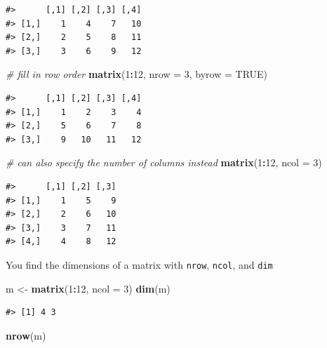 \documentclass[]{book}
\newenvironment{Shaded}{\begin{snugshade}}{\end{snugshade}}
\newcommand{\KeywordTok}[1]{\textcolor[rgb]{0.13,0.29,0.53}{\textbf{#1}}}
\newcommand{\DataTypeTok}[1]{\textcolor[rgb]{0.13,0.29,0.53}{#1}}
\newcommand{\DecValTok}[1]{\textcolor[rgb]{0.00,0.00,0.81}{#1}}
\newcommand{\StringTok}[1]{\textcolor[rgb]{0.31,0.60,0.02}{#1}}
\newcommand{\CommentTok}[1]{\textcolor[rgb]{0.56,0.35,0.01}{\textit{#1}}}
\newcommand{\OtherTok}[1]{\textcolor[rgb]{0.56,0.35,0.01}{#1}}
\newcommand{\OperatorTok}[1]{\textcolor[rgb]{0.81,0.36,0.00}{\textbf{#1}}}
\newcommand{\NormalTok}[1]{#1}
\theoremstyle{definition}
\theoremstyle{definition}
\theoremstyle{definition}
\theoremstyle{remark}
\begin{document}
\begin{verbatim}
#>      [,1] [,2] [,3] [,4]
#> [1,]    1    4    7   10
#> [2,]    2    5    8   11
#> [3,]    3    6    9   12
\end{verbatim}

\begin{Shaded}
\begin{Highlighting}[]
\CommentTok{# fill in row order}
\KeywordTok{matrix}\NormalTok{(}\DecValTok{1}\OperatorTok{:}\DecValTok{12}\NormalTok{, }\DataTypeTok{nrow =} \DecValTok{3}\NormalTok{, }\DataTypeTok{byrow =} \OtherTok{TRUE}\NormalTok{)}
\end{Highlighting}
\end{Shaded}

\begin{verbatim}
#>      [,1] [,2] [,3] [,4]
#> [1,]    1    2    3    4
#> [2,]    5    6    7    8
#> [3,]    9   10   11   12
\end{verbatim}

\begin{Shaded}
\begin{Highlighting}[]
\CommentTok{# can also specify the number of columns instead}
\KeywordTok{matrix}\NormalTok{(}\DecValTok{1}\OperatorTok{:}\DecValTok{12}\NormalTok{, }\DataTypeTok{ncol =} \DecValTok{3}\NormalTok{)}
\end{Highlighting}
\end{Shaded}

\begin{verbatim}
#>      [,1] [,2] [,3]
#> [1,]    1    5    9
#> [2,]    2    6   10
#> [3,]    3    7   11
#> [4,]    4    8   12
\end{verbatim}

You find the dimensions of a matrix with \texttt{nrow}, \texttt{ncol},
and \texttt{dim}

\begin{Shaded}
\begin{Highlighting}[]
\NormalTok{m <-}\StringTok{ }\KeywordTok{matrix}\NormalTok{(}\DecValTok{1}\OperatorTok{:}\DecValTok{12}\NormalTok{, }\DataTypeTok{ncol =} \DecValTok{3}\NormalTok{)}
\KeywordTok{dim}\NormalTok{(m)}
\end{Highlighting}
\end{Shaded}

\begin{verbatim}
#> [1] 4 3
\end{verbatim}

\begin{Shaded}
\begin{Highlighting}[]
\KeywordTok{nrow}\NormalTok{(m)}
\end{Highlighting}
\end{Shaded}
\end{document}
